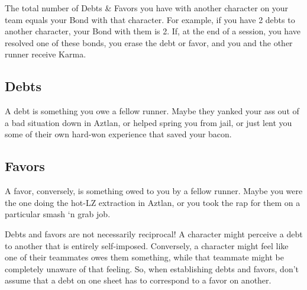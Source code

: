 The total number of Debts \& Favors you have with another character on your team equals your Bond with that character. For example, if you have 2 debts to another character, your Bond with them is 2. If, at the end of a session, you have resolved one of these bonds, you erase the debt or favor, and you and the other runner receive Karma.

\subsection{Debts}
A debt is something you owe a fellow runner. Maybe they yanked your ass out of a bad situation down in Aztlan, or helped spring you from jail, or just lent you some of their own hard-won experience that saved your bacon.

\subsection{Favors}
A favor, conversely, is something owed to you by a fellow runner. Maybe you were the one doing the hot-LZ extraction in Aztlan, or you took the rap for them on a particular smash ‘n grab job.

Debts and favors are not necessarily reciprocal! A character might perceive a debt to another that is entirely self-imposed. Conversely, a character might feel like one of their teammates owes them something, while that teammate might be completely unaware of that feeling. So, when establishing debts and favors, don’t assume that a debt on one sheet has to correspond to a favor on another.
